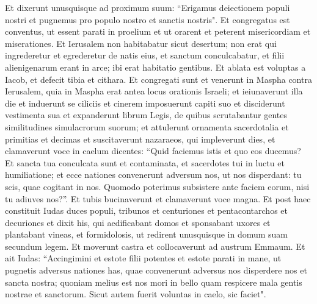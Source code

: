 \begin{biblechapter}
\verse Et dixerunt unusquisque ad proximum suum: “Erigamus deiectionem populi nostri et pugnemus pro populo nostro et sanctis nostris". 
\verse Et congregatus est conventus, ut essent parati in proelium et ut orarent et peterent misericordiam et miserationes.  
\verse Et Ierusalem non habitabatur sicut desertum; non erat qui ingrederetur et egrederetur de natis eius, et sanctum conculcabatur, et filii alienigenarum erant in arce; ibi erat habitatio gentibus. Et ablata est voluptas a Iacob, et defecit tibia et cithara. 
\verse Et congregati sunt et venerunt in Maspha contra Ierusalem, quia in Maspha erat antea locus orationis Israeli; 
\verse et ieiunaverunt illa die et induerunt se ciliciis et cinerem imposuerunt capiti suo et disciderunt vestimenta sua  
\verse et expanderunt librum Legis, de quibus scrutabantur gentes similitudines simulacrorum suorum; 
\verse et attulerunt ornamenta sacerdotalia et primitias et decimas et suscitaverunt nazaraeos, qui impleverunt dies, 
\verse et clamaverunt voce in caelum dicentes: “Quid faciemus istis et quo eos ducemus? 
\verse Et sancta tua conculcata sunt et contaminata, et sacerdotes tui in luctu et humiliatione; 
\verse et ecce nationes convenerunt adversum nos, ut nos disperdant: tu scis, quae cogitant in nos. 
\verse Quomodo poterimus subsistere ante faciem eorum, nisi tu adiuves nos?”. 
\verse Et tubis bucinaverunt et clamaverunt voce magna. 
\verse Et post haec constituit Iudas duces populi, tribunos et centuriones et pentacontarchos et decuriones 
\verse et dixit his, qui aedificabant domos et sponsabant uxores et plantabant vineas, et formidolosis, ut redirent unusquisque in domum suam secundum legem. 
\verse Et moverunt castra et collocaverunt ad austrum Emmaum. 
\verse Et ait Iudas: “Accingimini et estote filii potentes et estote parati in mane, ut pugnetis adversus nationes has, quae convenerunt adversus nos disperdere nos et sancta nostra; 
\verse quoniam melius est nos mori in bello quam respicere mala gentis nostrae et sanctorum. 
\verse Sicut autem fuerit voluntas in caelo, sic faciet". 
\end{biblechapter}

